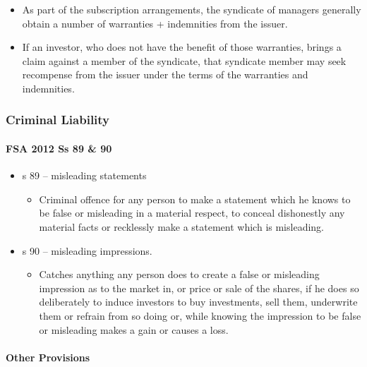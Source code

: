 \documentclass[
]{article}
\providecommand{\tightlist}{%
  \setlength{\itemsep}{0pt}\setlength{\parskip}{0pt}}
\begin{document}
\begin{itemize}
\tightlist
\item
  As part of the subscription arrangements, the syndicate of managers
  generally obtain a number of warranties + indemnities from the issuer.
\item
  If an investor, who does not have the benefit of those warranties,
  brings a claim against a member of the syndicate, that syndicate
  member may seek recompense from the issuer under the terms of the
  warranties and indemnities.
\end{itemize}

\hypertarget{criminal-liability}{%
\subsubsection{Criminal Liability}\label{criminal-liability}}

\hypertarget{fsa-2012-ss-89-90}{%
\paragraph{FSA 2012 Ss 89 \& 90}\label{fsa-2012-ss-89-90}}

\begin{itemize}
\tightlist
\item
  s 89 -- misleading statements

  \begin{itemize}
  \tightlist
  \item
    Criminal offence for any person to make a statement which he knows
    to be false or misleading in a material respect, to conceal
    dishonestly any material facts or recklessly make a statement which
    is misleading.
  \end{itemize}
\item
  s 90 -- misleading impressions.

  \begin{itemize}
  \tightlist
  \item
    Catches anything any person does to create a false or misleading
    impression as to the market in, or price or sale of the shares, if
    he does so deliberately to induce investors to buy investments, sell
    them, underwrite them or refrain from so doing or, while knowing the
    impression to be false or misleading makes a gain or causes a loss.
  \end{itemize}
\end{itemize}

\hypertarget{other-provisions}{%
\paragraph{Other Provisions}\label{other-provisions}}
\end{document}
